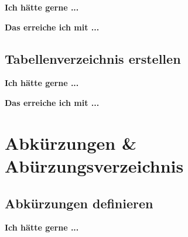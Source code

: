 \documentclass[twoside, 
               a4paper, 
               10pt, 
               parskip=full, 
               sectionentrydots=true, 
               listof=totoc, 
               listof=entryprefix,
               numbers=endperiod]{scrartcl}
\begin{document}
{\textbf {Ich hätte gerne ...}}
 



\newpage
{\textbf {Das erreiche ich mit ...}}
 
\begin{miniSeite}[colbacktitle=black!35!white,title=\LaTeX-Code]

\end{miniSeite}




\newpage
\subsection{Tabellenverzeichnis erstellen}
{\textbf {Ich hätte gerne ...}}
 
\begin{miniSeite}[colbacktitle=black!35!white,title=Ausdruck]

\end{miniSeite}


\newpage
{\textbf {Das erreiche ich mit ...}}
 
\begin{miniSeite}[colbacktitle=black!35!white,title=\LaTeX-Code]

\end{miniSeite}





\newpage
\section{Abkürzungen \& Abürzungsverzeichnis}
\subsection{Abkürzungen definieren}

{\textbf {Ich hätte gerne ...}}
 


\end{document}
